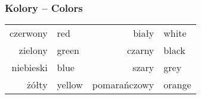 \documentclass[12pt]{refcard}
\begin{document}
\vspace{-1.33ex}
\subsubsection{Kolory -- Colors}
\vspace{-1ex}
\begin{tabular}{r@{ -- }lr@{ -- }l}
czerwony & red &
biały & white \\
zielony & green &
czarny & black \\
niebieski & blue &
szary & grey \\
żółty & yellow &
pomarańczowy & orange \\
\end{tabular}
\end{document}
